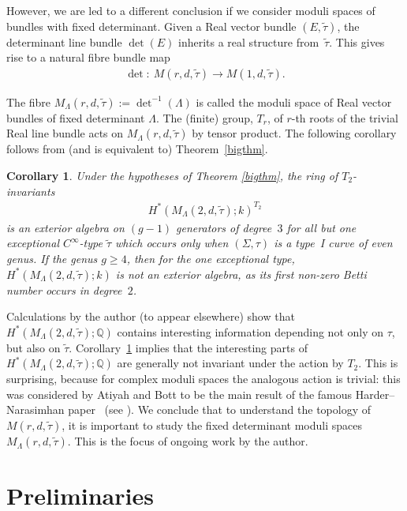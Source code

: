 \documentclass[pdftex]{sigma}
\numberwithin{equation}{section}
\newtheorem{Corollary}[Theorem]{Corollary}
{\theoremstyle{definition}
\newtheorem{Remark}[Theorem]{Remark}}
\begin{document}
However, we are led to a dif\/ferent conclusion if we consider moduli spaces of bundles with f\/ixed determinant. Given a Real vector bundle $(E,\tilde{\tau})$, the determinant line bundle $\det(E)$ inherits a real structure from~$\tilde{\tau}$. This gives rise to a natural f\/ibre bundle map
\begin{gather*} \det \colon \ M(r,d,\tilde{\tau}) \rightarrow M(1,d,\tilde{\tau}).\end{gather*}

The f\/ibre $M_{\Lambda}(r,d,\tilde{\tau}):= \det^{-1}(\Lambda)$ is called the moduli space of Real vector bundles of f\/ixed determinant $\Lambda$. The (f\/inite) group, $T_r$, of $r$-th roots of the trivial Real line bundle acts on $M_{\Lambda}(r,d,\tilde{\tau})$ by tensor product. The following corollary follows from (and is equivalent to) Theorem~\ref{bigthm}.

\begin{Corollary}\label{BigCor}
Under the hypotheses of Theorem {\rm \ref{bigthm}}, the ring of $T_2$-invariants \begin{gather*} H^*(M_{\Lambda}(2,d,\tilde{\tau}); k)^{T_2}\end{gather*} is an exterior algebra on $(g-1)$ generators of degree~$3$ for all but one exceptional $C^{\infty}$-type $\tilde{\tau}$ which occurs only when $(\Sigma,\tau)$ is a type~I curve of even genus. If the genus $g \geq 4$, then for the one exceptional type, $H^*(M_{\Lambda}(2,d,\tilde{\tau}); k)$ is not an exterior algebra, as its first non-zero Betti number occurs in degree~$2$.	
\end{Corollary}

Calculations by the author (to appear elsewhere) show that $H^*(M_{\Lambda}(2,d, \tilde{\tau}); {\mathbb Q})$ contains interesting information depending not only on $\tau$, but also on $\tilde{\tau}$. Corollary~\ref{BigCor} implies that the interesting parts of $H^*(M_{\Lambda}(2,d,\tilde{\tau}); {\mathbb Q})$ are generally not invariant under the action by $T_2$. This is surprising, because for complex moduli spaces the analogous action is trivial: this was considered by Atiyah and Bott to be the main result of the famous Harder--Narasimhan paper~\cite{HN} (see \cite[Section~9]{AB}). We conclude that to understand the topology of $M(r,d,\tilde{\tau})$, it is important to study the f\/ixed determinant moduli spaces $M_{\Lambda}(r,d,\tilde{\tau})$. This is the focus of ongoing work by the author.

\section{Preliminaries}
\end{document}
